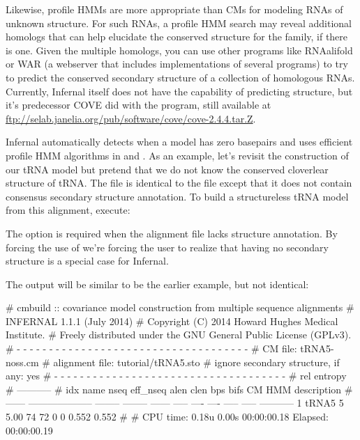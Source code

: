 Likewise, profile HMMs are more appropriate than CMs for modeling RNAs
of unknown structure. For such RNAs, a profile HMM search may reveal
additional homologs that can help elucidate the conserved structure
for the family, if there is one. Given the multiple homologs, you can
use other programs like RNAalifold \citep{Bernhart08,Hofacker02} or
WAR \citep{Torarinsson08b} (a webserver that includes implementations
of several programs) to try to predict the conserved secondary
structure of a collection of homologous RNAs. Currently, Infernal
itself does not have the capability of predicting structure, but it's
predecessor COVE did with the  program, still available at
\url{ftp://selab.janelia.org/pub/software/cove/cove-2.4.4.tar.Z}.

Infernal automatically detects when a model has zero basepairs and
uses efficient profile HMM algorithms in  and
. As an example, let's revisit the construction of our
tRNA model but pretend that we do not know the conserved cloverlear
structure of tRNA.
The file 
 is identical to the file 
 except that it does not contain consensus
secondary structure annotation. 
To build a structureless tRNA model from this alignment, execute:


The  option is required when the alignment file lacks
structure annotation. By forcing the use of  we're
forcing the user to realize that having no secondary structure is a
special case for Infernal.

The output will be similar to be the earlier example, but not
identical:

\begin{sreoutput}
# cmbuild :: covariance model construction from multiple sequence alignments
# INFERNAL 1.1.1 (July 2014)
# Copyright (C) 2014 Howard Hughes Medical Institute.
# Freely distributed under the GNU General Public License (GPLv3).
# - - - - - - - - - - - - - - - - - - - - - - - - - - - - - - - - - - - -
# CM file:                                            tRNA5-noss.cm
# alignment file:                                     tutorial/tRNA5.sto
# ignore secondary structure, if any:                 yes
# - - - - - - - - - - - - - - - - - - - - - - - - - - - - - - - - - - - -
#                                                                      rel entropy
#                                                                      -----------
# idx    name                     nseq eff_nseq   alen  clen  bps bifs    CM   HMM description
# ------ -------------------- -------- -------- ------ ----- ---- ---- ----- ----- -----------
       1 tRNA5                       5     5.00     74    72    0    0 0.552 0.552 
#
# CPU time: 0.18u 0.00s 00:00:00.18 Elapsed: 00:00:00.19
\end{sreoutput}


